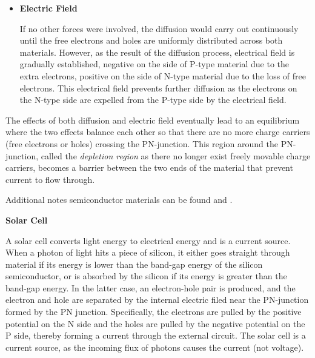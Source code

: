 \begin{itemize}
\begin{itemize}
\item {\bf Electric Field}

If no other forces were involved, the diffusion would carry out 
continuously until the free electrons and holes are uniformly distributed
across both materials. However, as the result of the diffusion process,
electrical field is gradually established, negative on the side of P-type 
material due to the extra electrons, positive on the side of N-type 
material due to the loss of free electrons. This electrical field prevents
further diffusion as the electrons on the N-type side are expelled from
the P-type side by the electrical field.

\end{itemize}



The effects of both diffusion and electric field eventually lead to an 
equilibrium where the two effects balance each other so that there are
no more charge carriers (free electrons or holes) crossing the PN-junction.
This region around the PN-junction, called the {\em depletion region} as 
there no longer exist freely movable charge carriers, becomes a barrier 
between the two ends of the material that prevent current to flow through.

Additional notes semiconductor materials can be found
 and
.

{\bf Solar Cell}

A solar cell converts light energy to electrical energy and is a current source.
When a photon of light hits a piece of silicon, it either goes straight through
material if its energy is lower than the band-gap energy of the silicon semiconductor,
or is absorbed by the silicon if its energy is greater than the band-gap energy.
In the latter case, an electron-hole pair is produced, and the electron and hole
are separated by the internal electric filed near the PN-junction formed by the 
PN junction. Specifically, the electrons are pulled by the positive potential on
the N side and the holes are pulled by the negative potential on the P side, 
thereby forming a current through the external circuit. The solar cell is a 
current source, as the incoming flux of photons causes the current (not voltage).


\end{itemize}

